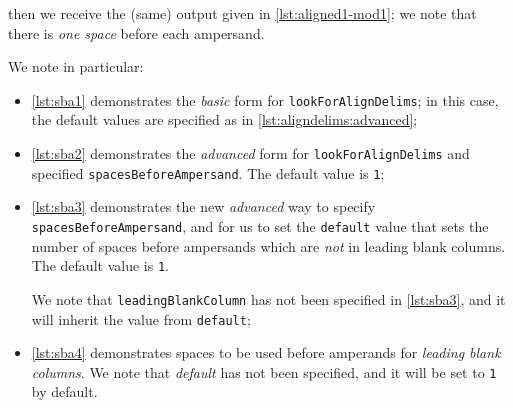 \begin{example}
 then we receive the (same) output given in \cref{lst:aligned1-mod1}; we note that there
 is \emph{one space} before each ampersand.

 \begin{cmhtcbraster}
 \end{cmhtcbraster}

 We note in particular:
 \begin{itemize}
  \item \cref{lst:sba1} demonstrates the \emph{basic} form for
        \texttt{lookForAlignDelims}; in this case,
        the default values are specified as in \vref{lst:aligndelims:advanced};
  \item \cref{lst:sba2} demonstrates the \emph{advanced} form for
        \texttt{lookForAlignDelims}
        and specified \texttt{spacesBeforeAmpersand}. The default value is \texttt{1};
  \item \cref{lst:sba3} demonstrates the new \emph{advanced} way to specify
        \texttt{spacesBeforeAmpersand}, and
        for us to set the \texttt{default} value that sets the number of spaces before ampersands
        which are \emph{not} in leading blank columns. The default value is \texttt{1}.

        We note that \texttt{leadingBlankColumn} has not been specified in
        \cref{lst:sba3}, and it will inherit the value from \texttt{default};
  \item \cref{lst:sba4} demonstrates spaces to be used before amperands for
        \emph{leading blank columns}.
        We note that \emph{default} has not been specified, and it will be set to \texttt{1} by
        default.
 \end{itemize}
 \end{example}

